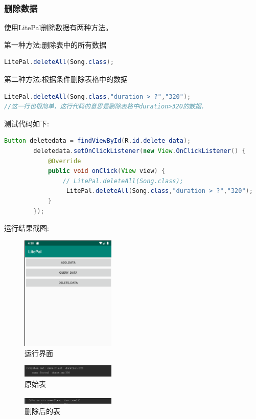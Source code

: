 \documentclass[cs4size,a4paper]{ctexart}
\numberwithin{equation}{section}
\numberwithin{table}{section}
\numberwithin{figure}{section}
\begin{document}
\subsubsection{删除数据}
使用LitePal删除数据有两种方法。

第一种方法:删除表中的所有数据
\begin{lstlisting}[language=java]
LitePal.deleteAll(Song.class);
\end{lstlisting}

第二种方法:根据条件删除表格中的数据
\begin{lstlisting}[language=java]
LitePal.deleteAll(Song.class,"duration > ?","320");
//这一行也很简单，这行代码的意思是删除表格中duration>320的数据.
\end{lstlisting}

测试代码如下:
\begin{lstlisting}[language=java]
        Button deletedata = findViewById(R.id.delete_data);
        deletedata.setOnClickListener(new View.OnClickListener() {
            @Override
            public void onClick(View view) {
                // LitePal.deleteAll(Song.class);
                 LitePal.deleteAll(Song.class,"duration > ?","320");
            }
        });
\end{lstlisting}
运行结果截图:
\begin{figure}[H]
\small
\centering
\includegraphics[width=0.4\textwidth]{delete}
\caption{运行界面} \label{运行界面}
\end{figure}

\begin{figure}[H]
\small
\centering
\includegraphics[width=0.4\textwidth]{delete1}
\caption{原始表} \label{原始表}
\end{figure}

\begin{figure}[H]
\small
\centering
\includegraphics[width=0.4\textwidth]{delete2}
\caption{删除后的表} \label{删除后的表}
\end{figure}
\end{document}
